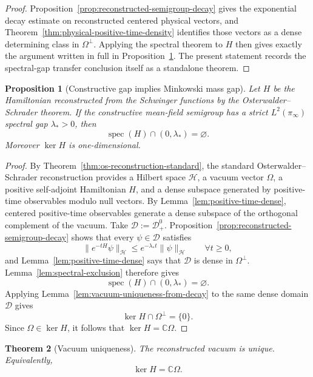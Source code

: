 \documentclass[11pt]{article}
\newtheorem{theorem}{Theorem}[section]
\newtheorem{proposition}[theorem]{Proposition}
\theoremstyle{definition}
\theoremstyle{remark}
\newcommand{\C}{\mathbb C}
\newcommand{\mcH}{\mathcal H}
\newcommand{\spec}{\operatorname{spec}}
\begin{document}
\begin{proof}
Proposition~\ref{prop:reconstructed-semigroup-decay} gives the exponential
decay estimate on reconstructed centered physical vectors, and
Theorem~\ref{thm:physical-positive-time-density} identifies those vectors as a
dense determining class in \(\Omega^\perp\).  Applying the spectral theorem to
\(H\) then gives exactly the argument written in full in
Proposition~\ref{prop:constructive-gap-implies-physical-gap}.  The present
statement records the spectral-gap transfer conclusion itself as a standalone
theorem.
\end{proof}

\begin{proposition}[Constructive gap implies Minkowski mass gap]
\label{prop:constructive-gap-implies-physical-gap}
Let $H$ be the Hamiltonian reconstructed from the Schwinger functions by the
Osterwalder--Schrader theorem.
If the constructive mean-field semigroup has a strict $L^2(\pi_\infty)$
spectral gap $\lambda_*>0$, then
\[
\spec(H)\cap(0,\lambda_*)=\varnothing.
\]
Moreover $\ker H$ is one-dimensional.
\end{proposition}

\begin{proof}
By Theorem~\ref{thm:os-reconstruction-standard}, the standard
Osterwalder--Schrader reconstruction provides a Hilbert space $\mcH$, a vacuum
vector $\Omega$, a positive self-adjoint Hamiltonian $H$, and a dense subspace
generated by positive-time observables modulo null vectors.  By
Lemma~\ref{lem:positive-time-dense}, centered positive-time observables
generate a dense subspace of the orthogonal complement of the vacuum.
Take \(\mathcal D:=\mathcal D_+^0\).  Proposition~\ref{prop:reconstructed-semigroup-decay}
shows that every \(\psi\in\mathcal D\) satisfies
\[
\|e^{-tH}\psi\|_{\mcH}\le e^{-\lambda_* t}\|\psi\|_{\mcH}
\qquad
\forall t\ge0,
\]
and Lemma~\ref{lem:positive-time-dense} says that \(\mathcal D\) is dense in
\(\Omega^\perp\).  Lemma~\ref{lem:spectral-exclusion} therefore gives
\[
\spec(H)\cap(0,\lambda_*)=\varnothing.
\]
Applying Lemma~\ref{lem:vacuum-uniqueness-from-decay} to the same dense domain
\(\mathcal D\) gives
\[
\ker H\cap\Omega^\perp=\{0\}.
\]
Since \(\Omega\in\ker H\), it follows that \(\ker H=\C\Omega\).
\end{proof}

\begin{theorem}[Vacuum uniqueness]
\label{thm:vacuum-uniqueness}
The reconstructed vacuum is unique.  Equivalently,
\[
\ker H=\C\Omega.
\]
\end{theorem}
\end{document}
